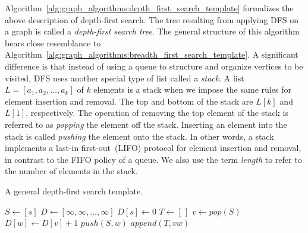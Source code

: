 Algorithm~\ref{alg:graph_algorithms:depth_first_search_template}
formalizes the above description of depth-first search. The tree
resulting from applying DFS on a graph is called a
\emph{depth-first search tree}. The general structure of this
algorithm bears close resemblance to
Algorithm~\ref{alg:graph_algorithms:breadth_first_search_template}. A
significant difference is that instead of using a queue to structure
and organize vertices to be visited, DFS uses another special type of
list called a \emph{stack}. A list $L = [a_1, a_2, \dots, a_k]$ of $k$
elements is a stack when we impose the same rules for element
insertion and removal. The top and bottom of the stack are $L[k]$ and
$L[1]$, respectively. The operation of removing the top element of the
stack is referred to as \emph{popping} the element off the
stack. Inserting an element into the stack is called \emph{pushing}
the element onto the stack. In other words, a stack implements a
last-in first-out~(LIFO) protocol for element insertion and removal,
in contrast to the FIFO policy of a queue. We also use the term
\emph{length} to refer to the number of elements in the stack.

\begin{algorithm}[!ht]
    \caption{A general depth-first search template.}
    \label{alg:graph_algorithms:depth_first_search_template}
    \begin{algorithmic}[1]
	\State $S \leftarrow [s]$
	\State $D \leftarrow [\infty, \infty, \dots, \infty]$
	\State $D[s] \leftarrow 0$	
	\State $T \leftarrow [\,]$
		\State $v \leftarrow pop(S)$
				\State $D[w] \leftarrow D[v] + 1$
				\State $push(S, w)$
				\State $append(T, vw)$
			\EndIf
		\EndFor
	\EndWhile	
    \end{algorithmic}
\end{algorithm}
